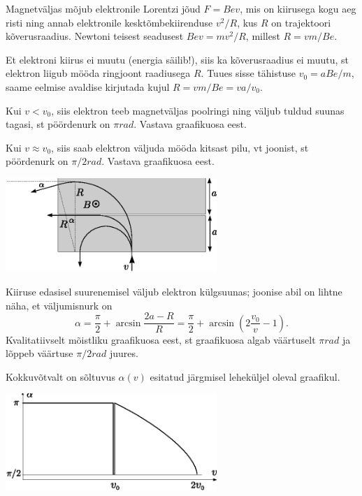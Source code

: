 \documentclass[10pt, twoside]{article}
\begin{document}
{%

\solu
Magnetväljas mõjub elektronile Lorentzi jõud $F=Bev$, mis on kiirusega kogu aeg risti ning
annab elektronile kesktõmbekiirenduse $v^2/R$, kus $R$ on trajektoori kõverusraadius. Newtoni teisest seadusest $Bev=mv^2/R$, millest $R=vm/Be$.

Et elektroni kiirus ei muutu (energia säilib!), siis ka kõverusraadius ei muutu, st elektron liigub mööda ringjoont raadiusega $R$.
Tuues sisse tähistuse $v_0=aBe/m$, saame eelmise avaldise kirjutada kujul $R=vm/Be=va/v_0$.

Kui $v< v_0$, siis elektron teeb magnetväljas poolringi ning väljub tuldud suunas tagasi,
st pöördenurk on $\pi\si{rad}$. Vastava graafikuosa eest.

Kui $v\approx v_0$, siis saab elektron väljuda mööda kitsast pilu, vt joonist, st pöördenurk on $\pi/2\si{rad}$. Vastava graafikuosa eest.

\begin{center}
	\includegraphics[width=0.6\textwidth]{2010-v2g-09-elektronlah.eps}
\end{center}

Kiiruse edasisel suurenemisel väljub elektron külgsuunas; joonise abil on lihtne näha, et väljumisnurk on
\[
\alpha =\frac \pi 2 + \arcsin \frac{2a -R}{R}=\frac \pi 2 + \arcsin \left(2\frac {v_0}v -1\right).
\]
Kvalitatiivselt mõistliku graafikuosa eest, st graafikuosa algab väärtuselt $\pi\si{rad}$
ja lõppeb väärtuse $\pi/2\si{rad}$ juures.

Kokkuvõtvalt on sõltuvus $\alpha (v)$ esitatud järgmisel leheküljel oleval graafikul.

\begin{center}
	\includegraphics[width=0.6\textwidth]{2010-v2g-09-elektronlah2.eps}
\end{center}
\probend
\bigskip

}
\end{document}

